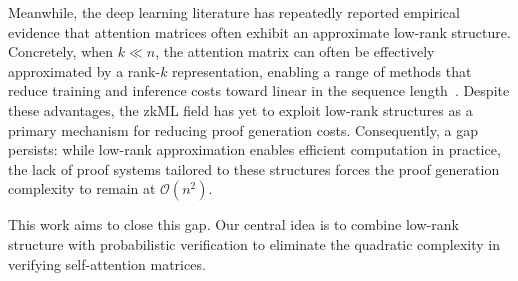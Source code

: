 \documentclass[letterpaper,twocolumn,10pt]{article}
\begin{document}
Meanwhile, the deep learning literature has repeatedly reported empirical evidence that attention matrices often exhibit an approximate low-rank structure. Concretely, when $k \ll n$, the attention matrix can often be effectively approximated by a rank-$k$ representation, enabling a range of methods that reduce training and inference costs toward linear in the sequence length~\cite{Linformer, Nystromformer}. Despite these advantages, the zkML field has yet to exploit low-rank structures as a primary mechanism for reducing proof generation costs. Consequently, a gap persists: while low-rank approximation enables efficient computation in practice, the lack of proof systems tailored to these structures forces the proof generation complexity to remain at $\mathcal{O}(n^2)$.

This work aims to close this gap. Our central idea is to combine low-rank structure with probabilistic verification to eliminate the quadratic complexity in verifying self-attention matrices.
\end{document}
